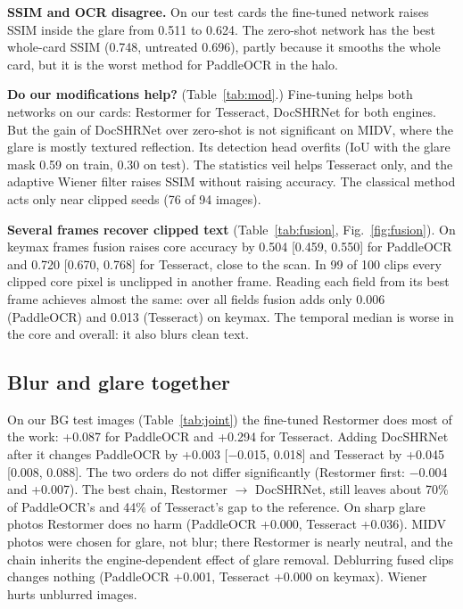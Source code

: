 \documentclass{article}
\begin{document}
\textbf{SSIM and OCR disagree.} On our test cards the fine-tuned network raises SSIM inside the glare from 0.511 to 0.624. The zero-shot network has the best whole-card SSIM (0.748, untreated 0.696), partly because it smooths the whole card, but it is the worst method for PaddleOCR in the halo.

\textbf{Do our modifications help?} (Table~\ref{tab:mod}.) Fine-tuning helps both networks on our cards: Restormer for Tesseract, DocSHRNet for both engines. But the gain of DocSHRNet over zero-shot is not significant on MIDV, where the glare is mostly textured reflection. Its detection head overfits (IoU with the glare mask 0.59 on train, 0.30 on test). The statistics veil helps Tesseract only, and the adaptive Wiener filter raises SSIM without raising accuracy. The classical method acts only near clipped seeds (76 of 94 images).

\begin{table}[t]
\centering
\caption{Both artifacts: paired change of character accuracy (all boxes) vs untreated. A $\rightarrow$ B: A first. Both networks fine-tuned.}
\label{tab:joint}

\end{table}

\textbf{Several frames recover clipped text} (Table~\ref{tab:fusion}, Fig.~\ref{fig:fusion}). On keymax frames fusion raises core accuracy by 0.504 [0.459, 0.550] for PaddleOCR and 0.720 [0.670, 0.768] for Tesseract, close to the scan. In 99 of 100 clips every clipped core pixel is unclipped in another frame. Reading each field from its best frame achieves almost the same: over all fields fusion adds only 0.006 (PaddleOCR) and 0.013 (Tesseract) on keymax. The temporal median is worse in the core and overall: it also blurs clean text.

\subsection{Blur and glare together}
On our BG test images (Table~\ref{tab:joint}) the fine-tuned Restormer does most of the work: +0.087 for PaddleOCR and +0.294 for Tesseract. Adding DocSHRNet after it changes PaddleOCR by +0.003 [$-$0.015, 0.018] and Tesseract by +0.045 [0.008, 0.088]. The two orders do not differ significantly (Restormer first: $-$0.004 and +0.007). The best chain, Restormer $\rightarrow$ DocSHRNet, still leaves about 70\% of PaddleOCR's and 44\% of Tesseract's gap to the reference. On sharp glare photos Restormer does no harm (PaddleOCR +0.000, Tesseract +0.036). MIDV photos were chosen for glare, not blur; there Restormer is nearly neutral, and the chain inherits the engine-dependent effect of glare removal. Deblurring fused clips changes nothing (PaddleOCR +0.001, Tesseract +0.000 on keymax). Wiener hurts unblurred images.
\end{document}
